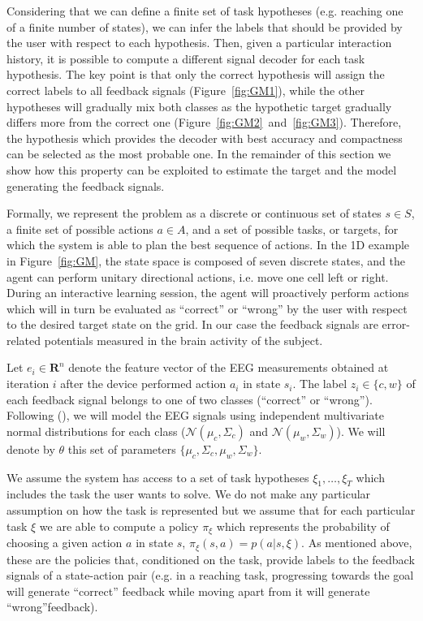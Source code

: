 Considering that we can define a finite set of task hypotheses (e.g. reaching one of a finite number of states), we can infer the labels that should be provided by the user with respect to each hypothesis. Then, given a particular interaction history, it is possible to compute a different signal decoder for each task hypothesis. The key point is that only the correct hypothesis will assign the correct labels to all feedback signals (Figure~\ref{fig:GM1}), while the other hypotheses will gradually mix both classes as the hypothetic target gradually differs more from the correct one (Figure~\ref{fig:GM2}~and~\ref{fig:GM3}). Therefore, the hypothesis which provides the decoder with best accuracy and compactness can be selected as the most probable one. In the remainder of this section we show how this property can be exploited to estimate the target and the model generating the feedback signals.

Formally, we represent the problem as a discrete or continuous set of states $s \in S$,  a finite set of possible actions $a \in A$, and a set of possible tasks, or targets, for which the system is able to plan the best sequence of actions. In the 1D example in Figure~\ref{fig:GM}, the state space is composed of seven discrete states, and the agent can perform unitary directional actions, i.e. move one cell left or right. During an interactive learning session, the agent will proactively perform actions which will in turn be evaluated as ``correct'' or ``wrong'' by the user with respect to the desired target state on the grid. In our case the feedback signals are error-related potentials measured in the brain activity of the subject.

Let $e_i\in \mathbf{R}^n$ denote the feature vector of the EEG measurements obtained at iteration $i$ after the device performed action $a_i$ in state $s_i$. The label $z_i\in\{c,w\}$ of each feedback signal belongs to one of two classes (``correct'' or ``wrong'').
%
Following \cite{blankertz2010single} (\cite{blankertz2010single}), we will model the EEG signals using independent multivariate normal distributions for each class ($\mathcal{N}(\mu_c, \Sigma_c)$ and $\mathcal{N}(\mu_w, \Sigma_w)$). We will denote by $\theta$ this set of parameters $\{\mu_c, \Sigma_c,\mu_w, \Sigma_w\}$.

We assume the system has access to a set of task hypotheses $\xi_1,\ldots,\xi_T$ which includes the task the user wants to solve. We do not make any particular assumption on how the task is represented but we assume that for each particular task $\xi$ we are able to compute a policy $\pi_\xi$ which represents the probability of choosing a given action $a$ in state $s$, $\pi_{\xi}(s,a) = p(a|s,\xi)$. As mentioned above, these are the policies that, conditioned on the task, provide labels to the feedback signals of a state-action pair (e.g. in a reaching task, progressing towards the goal will generate ``correct'' feedback while moving apart from it will generate ``wrong''feedback).

